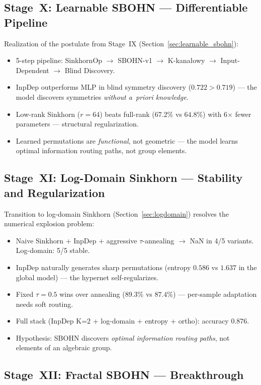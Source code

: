 \documentclass[11pt,a4paper]{report}
\begin{document}
\subsection{Stage~X: Learnable SBOHN --- Differentiable Pipeline}

Realization of the postulate from Stage~IX (Section~\ref{sec:learnable_sbohn}):
\begin{itemize}
\item 5-step pipeline: SinkhornOp $\to$ SBOHN-v1 $\to$ K-kanałowy $\to$ Input-Dependent $\to$ Blind Discovery.
\item InpDep outperforms MLP in blind symmetry discovery ($0.722 > 0.719$) --- the model discovers symmetries \emph{without a~priori knowledge}.
\item Low-rank Sinkhorn ($r{=}64$) beats full-rank ($67.2\%$ vs $64.8\%$) with 6$\times$ fewer parameters --- structural regularization.
\item Learned permutations are \emph{functional}, not geometric --- the model learns optimal information routing paths, not group elements.
\end{itemize}

\subsection{Stage~XI: Log-Domain Sinkhorn --- Stability and Regularization}

Transition to log-domain Sinkhorn (Section~\ref{sec:logdomain}) resolves the numerical explosion problem:
\begin{itemize}
\item Naive Sinkhorn + InpDep + aggressive $\tau$-annealing $\to$ NaN in 4/5 variants. Log-domain: 5/5 stable.
\item InpDep naturally generates sharp permutations (entropy $0.586$ vs $1.637$ in the global model) --- the hypernet self-regularizes.
\item Fixed $\tau{=}0.5$ wins over annealing ($89.3\%$ vs $87.4\%$) --- per-sample adaptation needs soft routing.
\item Full stack (InpDep K=2 + log-domain + entropy + ortho): accuracy $0.876$.
\item Hypothesis: SBOHN discovers \emph{optimal information routing paths}, not elements of an algebraic group.
\end{itemize}

\subsection{Stage~XII: Fractal SBOHN --- Breakthrough}
\end{document}
